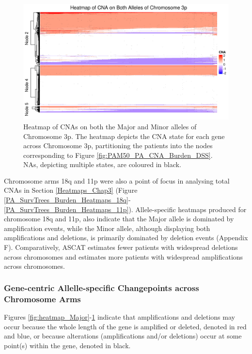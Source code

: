 \begin{figure}[H]
\centering
\includegraphics[width = 1\textwidth]{../figures/Chapter_6/Heatmap_Chr3p_Genes_Both_Alleles.png}
\caption[Heatmap of CNAs on both the Major and Minor alleles of Chromosome 3p]{Heatmap of CNAs on both the Major and Minor alleles of Chromosome 3p. The heatmap depicts the CNA state for each gene across Chromosome 3p, partitioning the patients into the nodes corresponding to Figure \ref{fig:PAM50_PA_CNA_Burden_DSS}. NAs, depicting multiple states, are coloured in black.}
\label{fig:heatmap_Both}
\end{figure}

Chromosome arms 18q and 11p were also a point of focus in analysing total CNAs in Section \ref{Heatmaps_Chap3} (Figure \ref{PA_SurvTrees_Burden_Heatmaps_18q}-\ref{PA_SurvTrees_Burden_Heatmaps_11p}). Allele-specific heatmaps produced for chromosome 18q and 11p, also indicate that the Major allele is dominated by amplification events, while the Minor allele, although displaying both amplifications and deletions, is primarily dominated by deletion events (Appendix F). Comparatively, ASCAT estimates fewer patients with widespread deletions across chromosomes and estimates more patients with widespread amplifications across chromosomes.

\subsubsection{Gene-centric Allelle-specific Changepoints across Chromosome Arms}
Figures \ref{fig:heatmap_Major}-\ref{fig:heatmap_Both} indicate that amplifications and deletions may occur because the whole length of the gene is amplified or deleted, denoted in red and blue, or because alterations (amplifications and/or deletions) occur at some point(s) within the gene, denoted in black. 

